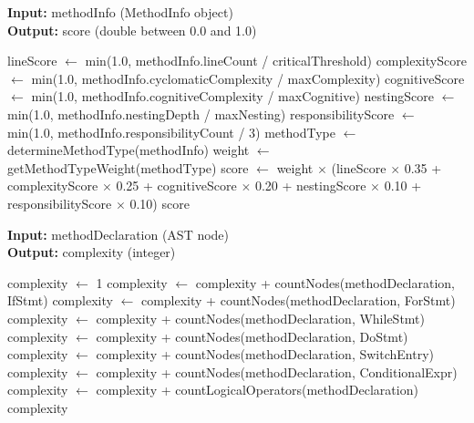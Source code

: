 \documentclass[12pt,a4paper]{article}
\begin{document}
    \begin{algorithm}[H]
        \caption{calculateComplexityScore}
        \textbf{Input:} methodInfo (MethodInfo object)\\
        \textbf{Output:} score (double between 0.0 and 1.0)
        \begin{algorithmic}[1]
            \State lineScore $\gets$ min(1.0, methodInfo.lineCount / criticalThreshold)
            \State complexityScore $\gets$ min(1.0, methodInfo.cyclomaticComplexity / maxComplexity)
            \State cognitiveScore $\gets$ min(1.0, methodInfo.cognitiveComplexity / maxCognitive)
            \State nestingScore $\gets$ min(1.0, methodInfo.nestingDepth / maxNesting)
            \State responsibilityScore $\gets$ min(1.0, methodInfo.responsibilityCount / 3)
            \State methodType $\gets$ determineMethodType(methodInfo)
            \State weight $\gets$ getMethodTypeWeight(methodType)
            \State score $\gets$ weight $\times$ (lineScore $\times$ 0.35 + complexityScore $\times$ 0.25 +
            \State \hspace{2.5cm} cognitiveScore $\times$ 0.20 + nestingScore $\times$ 0.10 +
            \State \hspace{2.5cm} responsibilityScore $\times$ 0.10)
            \Return score
        \end{algorithmic}
    \end{algorithm}

    \begin{algorithm}[H]
        \caption{calculateCyclomaticComplexity}
        \textbf{Input:} methodDeclaration (AST node)\\
        \textbf{Output:} complexity (integer)
        \begin{algorithmic}[1]
            \State complexity $\gets$ 1
            \State complexity $\gets$ complexity + countNodes(methodDeclaration, IfStmt)
            \State complexity $\gets$ complexity + countNodes(methodDeclaration, ForStmt)
            \State complexity $\gets$ complexity + countNodes(methodDeclaration, WhileStmt)
            \State complexity $\gets$ complexity + countNodes(methodDeclaration, DoStmt)
            \State complexity $\gets$ complexity + countNodes(methodDeclaration, SwitchEntry)
            \State complexity $\gets$ complexity + countNodes(methodDeclaration, ConditionalExpr)
            \State complexity $\gets$ complexity + countLogicalOperators(methodDeclaration)
            \Return complexity
        \end{algorithmic}
    \end{algorithm}
\end{document}
